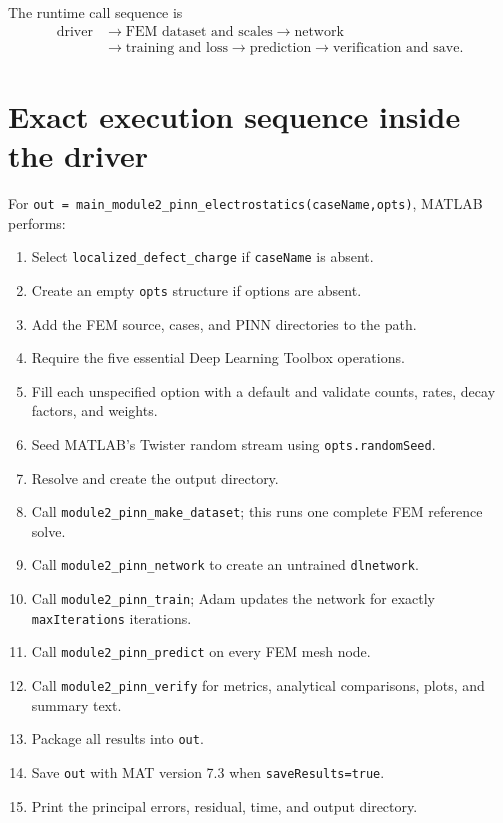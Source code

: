 \documentclass[11pt]{article}
\begin{document}
The runtime call sequence is
\begin{align*}
\boxed{\text{driver}}
&\rightarrow
\boxed{\text{FEM dataset and scales}}
\rightarrow
\boxed{\text{network}}\\
&\rightarrow
\boxed{\text{training and loss}}
\rightarrow
\boxed{\text{prediction}}
\rightarrow
\boxed{\text{verification and save}}.
\end{align*}

\section{Exact execution sequence inside the driver}

For \texttt{out = main\_module2\_pinn\_electrostatics(caseName,opts)}, MATLAB performs:
\begin{enumerate}[leftmargin=*]
  \item Select \texttt{localized\_defect\_charge} if \texttt{caseName} is absent.
  \item Create an empty \texttt{opts} structure if options are absent.
  \item Add the FEM source, cases, and PINN directories to the path.
  \item Require the five essential Deep Learning Toolbox operations.
  \item Fill each unspecified option with a default and validate counts, rates, decay factors, and weights.
  \item Seed MATLAB's Twister random stream using \texttt{opts.randomSeed}.
  \item Resolve and create the output directory.
  \item Call \texttt{module2\_pinn\_make\_dataset}; this runs one complete FEM reference solve.
  \item Call \texttt{module2\_pinn\_network} to create an untrained \texttt{dlnetwork}.
  \item Call \texttt{module2\_pinn\_train}; Adam updates the network for exactly \texttt{maxIterations} iterations.
  \item Call \texttt{module2\_pinn\_predict} on every FEM mesh node.
  \item Call \texttt{module2\_pinn\_verify} for metrics, analytical comparisons, plots, and summary text.
  \item Package all results into \texttt{out}.
  \item Save \texttt{out} with MAT version 7.3 when \texttt{saveResults=true}.
  \item Print the principal errors, residual, time, and output directory.
\end{enumerate}
\end{document}
